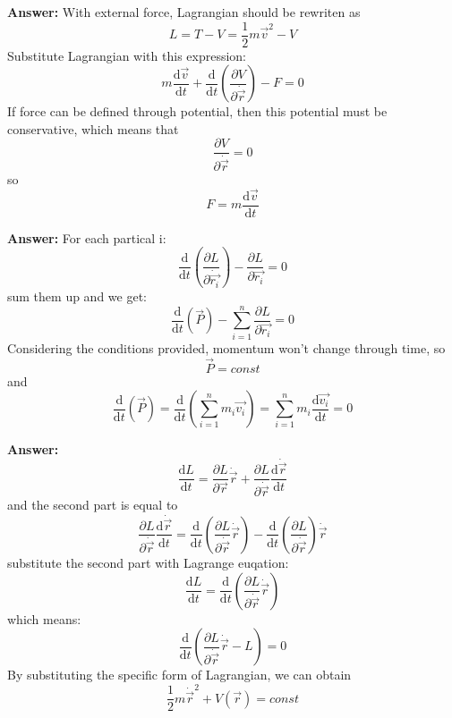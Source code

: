 \documentclass[11pt]{article}
\begin{document}
\textbf{Answer:}
With external force, Lagrangian should be rewriten as
$$
L=T-V=\frac{1}{2}m\vec{v}^2-V
$$
Substitute Lagrangian with this expression:
$$
m\frac{\mathrm{d}\vec{v}}{\mathrm{d}t}+\frac{\mathrm{d}}{\mathrm{d}t}(\frac{\partial V}{\partial \dot{\vec{r}}})-F=0
$$
If force can be defined through potential, then this potential must be conservative, which means that
$$
\frac{\partial V}{\partial \dot{\vec{r}}}=0
$$
so
$$
F=m\frac{\mathrm{d}\vec{v}}{\mathrm{d}t}
$$

\textbf{Answer:}
For each partical i:
$$
\frac{\mathrm{d}}{\mathrm{d}t}(\frac{\partial L}{\partial \dot{\vec{r_i}}})-\frac{\partial L}{\partial \vec{r_i}}=0
$$
sum them up and we get:
$$
\frac{\mathrm{d}}{\mathrm{d}t}(\vec{P})-\sum_{i=1}^{n}\frac{\partial L}{\partial \vec{r_i}}=0
$$
Considering the conditions provided, momentum won't change through time, so
$$
\vec{P}=const
$$
and
$$
\frac{\mathrm{d}}{\mathrm{d}t}(\vec{P})=\frac{\mathrm{d}}{\mathrm{d}t}(\sum_{i=1}^{n}m_i\vec{v_i})=\sum_{i=1}^{n}m_i\frac{\mathrm{d}\vec{v_i}}{\mathrm{d}t}=0
$$

\textbf{Answer:}
$$
\frac{\mathrm{d}L}{\mathrm{d}t}=\frac{\partial L}{\partial \vec{r}}\dot{\vec{r}}+\frac{\partial L}{\partial \dot{\vec{r}}}\frac{\mathrm{d}\dot{\vec{r}}}{\mathrm{d}t}
$$
and the second part is equal to
$$
\frac{\partial L}{\partial \dot{\vec{r}}}\frac{\mathrm{d}\dot{\vec{r}}}{\mathrm{d}t}=\frac{\mathrm{d}}{\mathrm{d}t}(\frac{\partial L}{\partial \dot{\vec{r}}}\dot{\vec{r}})-\frac{\mathrm{d}}{\mathrm{d}t}(\frac{\partial L}{\partial \dot{\vec{r}}})\dot{\vec{r}}
$$
substitute the second part with Lagrange euqation:
$$
\frac{\mathrm{d}L}{\mathrm{d}t}=\frac{\mathrm{d}}{\mathrm{d}t}(\frac{\partial L}{\partial \dot{\vec{r}}}\dot{\vec{r}})
$$
which means:
$$
\frac{\mathrm{d}}{\mathrm{d}t}(\frac{\partial L}{\partial \dot{\vec{r}}}\dot{\vec{r}}-L)=0
$$
By substituting the specific form of Lagrangian, we can obtain
$$
\frac{1}{2}m\dot{\vec{r}}^2+V(\vec{r})=const
$$
\end{document}
